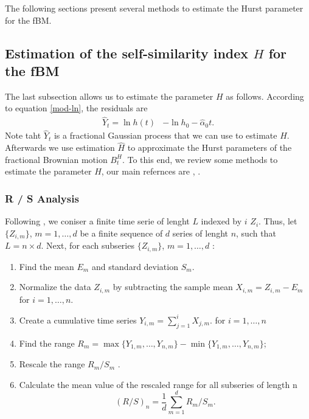 \documentclass[smallextended]{svjour3}
\begin{document}
        The following sections present several methods to estimate the Hurst 
    parameter for the fBM.


    \subsection{Estimation of the self-similarity index $H$ for the fBM}
    \label{Desc-Est-H}

        The last subsection allows us to estimate the parameter $H$ as follows.
    According to equation \eqref{mod-ln}, the residuals are 
    \begin{align*}
        \hat Y_t= \ln h(t)&-\ln h_0 -\widehat \alpha_0t.
    \end{align*}
        Note taht $\hat Y_t$ is a fractional Gaussian process that we can use 
    to estimate $H$. Afterwards we use estimation $\hat H$ to approximate
    the Hurst parameters of the fractional Brownian motion $B_t^H$.
    To this end, we review some methods to estimate
    the parameter $H$, our main refernces are \cite{we}, .


    \subsubsection{R / S Analysis}
    Following \citet{we}, we coniser a finite time serie of lenght $L$ indexed
    by $i$ $Z_i$. Thus, let $\{Z_{i,m}\}$, $m = 1,\ldots,d$ be a finite 
    sequence of $d$ series of lenght $n$, such that $L = n \times d$.
    Next, for each subseries  
    $\{Z_{i,m}\}$, $m = 1,\ldots,d$ :
    \begin{enumerate}
        \item 
            Find the mean $E_m$ and standard deviation $S_m$.
        \item 
            Normalize the data $Z_{i,m}$  by subtracting the sample mean 
            $X_{i,m} = Z_{i,m}-E_m$ for $i=1,\ldots,n$.
        \item 
            Create a cumulative time series $Y_{i,m} = \sum_{j=1}^i X_{j,m}$.
            for $i = 1,\ldots,n$
        \item 
            Find the range 
            $   
                R_m = \max\{Y_{1,m},\ldots, Y_{n,m}\} -
                \min\{Y_{1,m},\ldots, Y_{n,m} \}
            $;
        \item 
            Rescale the range $R_m/S_m$ .
        \item 
            Calculate the mean value of the rescaled range
            for all subseries of length n
            \[
                (R/S)_n =\frac{1}{d}\sum_{m=1}^d  R_m /S_m.
            \]
    \end{enumerate}
\end{document}
